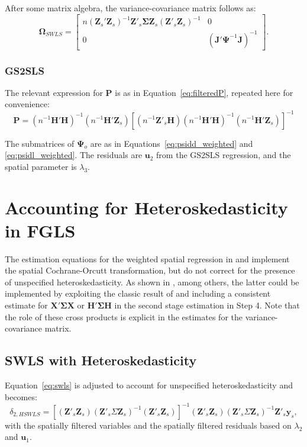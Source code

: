 \documentclass{article}
\begin{document}
After some matrix algebra, the variance-covariance matrix follows as:
\begin{equation*}
\mathbf{\Omega}_{SWLS} =
\left[
\begin{matrix}
n (\mathbf{Z}_s'\mathbf{Z}_s )^{-1} \mathbf{Z'}_s \mathbf{\Sigma}
  \mathbf{Z}_s (\mathbf{Z'}_s \mathbf{Z}_s )^{-1} & 0\\
 0 & ( \mathbf{J'} \mathbf{\Psi}^{-1} \mathbf{J} )^{-1}
 \end{matrix}
\right].
\end{equation*}

\subsubsection{GS2SLS}\label{ss:asyvargs2sls}


The relevant expression for $\mathbf{P}$ is as in Equation~\ref{eq:filteredP}, repeated here for convenience:
\begin{equation*}
\mathbf{P} = (n^{-1}\mathbf{H'H})^{-1} ( n^{-1} \mathbf{H'Z}_s ) 
        [ (n^{-1} \mathbf{Z'}_s \mathbf{H} ) (n^{-1} \mathbf{H'H} )^{-1} (n^{-1} \mathbf{H'Z}_s) ]^{-1}
\end{equation*}

The submatrices of $\mathbf{\Psi}_o$ are as in Equations~\ref{eq:psidd_weighted}
and \ref{eq:psidl_weighted}. The residuals are $\mathbf{u}_2$ from the GS2SLS regression,
and the spatial parameter is $\lambda_3$.



\section{Accounting for Heteroskedasticity in FGLS}
The estimation equations for the weighted spatial regression in 
\cite{KelejianPrucha:10} and \cite{Arraizetal:10}  implement the
spatial Cochrane-Orcutt transformation, but do not correct for the
presence of unspecified heteroskedasticity. As shown in \citet[p. 931]{Anselin:06},
among others, the latter could be
implemented by exploiting the
classic result of \cite{White:80} and including a consistent estimate
for $\mathbf{X' \Sigma X}$ or $\mathbf{H' \Sigma H}$ in the second stage
estimation in Step 4. Note that the role of these cross products is explicit
in the estimates for the variance-covariance matrix.

\subsection{SWLS with Heteroskedasticity}
Equation~\ref{eq:swls} is adjusted to account for unspecified heteroskedasticity
and becomes:
\begin{equation*}
\delta_{2,HSWLS} =  [ ( \mathbf{Z'}_s \mathbf{Z}_s ) ( \mathbf{Z'}_s \Sigma \mathbf{Z}_s )^{-1}
 ( \mathbf{Z'}_s \mathbf{Z}_s) ]^{-1} ( \mathbf{Z'}_s \mathbf{Z}_s )  ( \mathbf{Z'}_s \Sigma \mathbf{Z}_s )^{-1} \mathbf{Z'}_s \mathbf{y}_s,
\end{equation*}
with the spatially filtered variables and the spatially filtered residuals based on $\lambda_2$
and $\mathbf{u}_1$.
\end{document}
